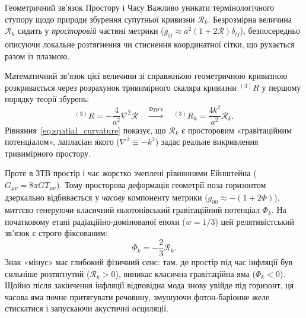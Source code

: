 \begin{keybox}{Геометричний зв'язок Простору і Часу}
Важливо уникати термінологічного ступору щодо природи збурення супутньої кривизни $\mathcal{R}_k$. Безрозмірна величина $\mathcal{R}_k$ сидить у \emph{просторовій} частині метрики ($g_{ij} \approx a^2(1+2\mathcal{R})\delta_{ij}$), безпосередньо описуючи локальне розтягнення чи стиснення координатної сітки, що рухається разом із плазмою.

Математичний зв'язок цієї величини зі справжньою геометричною кривизною розкривається через розрахунок тривимірного скаляра кривизни $^{(3)}R$ у першому порядку теорії збурень:
\begin{equation}\label{eq:spatial_curvature}
  ^{(3)}R = -\frac{4}{a^2} \nabla^2 \mathcal{R}
  \quad\xrightarrow{\text{Фур'є}}\quad
  ^{(3)}R_k = \frac{4k^2}{a^2} \mathcal{R}_k.
\end{equation}
Рівняння~\eqref{eq:spatial_curvature} показує, що $\mathcal{R}_k$ є просторовим «гравітаційним потенціалом», лапласіан якого ($\nabla^2 \equiv -k^2$) задає реальне викривлення тривимірного простору.

Проте в ЗТВ простір і час жорстко зчеплені рівняннями Ейнштейна ($G_{\mu\nu} = 8\pi G T_{\mu\nu}$). Тому просторова деформація геометрії поза горизонтом дзеркально відбивається у \emph{часову} компоненту метрики ($g_{00} \approx -(1+2\Phi)$), миттєво генеруючи класичний ньютонівський гравітаційний потенціал $\Phi_k$. На початковому етапі радіаційно-домінованої епохи ($w=1/3$) цей релятивістський зв'язок є строго фіксованим:
\begin{equation}\label{eq:R_to_Phi}
  \Phi_k = -\frac{2}{3}\mathcal{R}_k.
\end{equation}
Знак «мінус» має глибокий фізичний сенс: там, де простір під час інфляції був сильніше розтягнутий ($\mathcal{R}_k > 0$), виникає класична гравітаційна яма ($\Phi_k < 0$). Щойно після закінчення інфляції відповідна мода знову увійде під горизонт, ця часова яма почне притягувати речовину, змушуючи фотон-баріонне желе стискатися і запускаючи акустичні осциляції.
\end{keybox}


